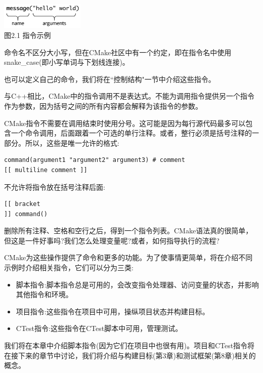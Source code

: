 \begin{center}
\includegraphics[width=0.3\textwidth]{content/1/chapter2/images/1.jpg}\\
图2.1 指令示例
\end{center}

命令名不区分大小写，但在CMake社区中有一个约定，即在指令名中使用snake\_case(即小写单词与下划线连接)。

也可以定义自己的命令，我们将在“控制结构"一节中介绍这些指令。

与C++相比，CMake中的指令调用不是表达式。不能为调用指令提供另一个指令作为参数，因为括号之间的所有内容都会解释为该指令的参数。

CMake指令不需要在调用结束时使用分号。这可能是因为每行源代码最多可以包含一个命令调用，后面跟着一个可选的单行注释。或者，整行必须是括号注释的一部分。所以，这些是唯一允许的格式:

\begin{lstlisting}[style=styleCMake]	
command(argument1 "argument2" argument3) # comment
[[ multiline comment ]]
\end{lstlisting}

不允许将指令放在括号注释后面:

\begin{lstlisting}[style=styleCMake]	
[[ bracket
]] command()
\end{lstlisting}

删除所有注释、空格和空行之后，得到一个指令列表。CMake语法真的很简单，但这是一件好事吗?我们怎么处理变量呢?或者，如何指导执行的流程?

CMake为这些操作提供了命令和更多的功能。为了使事情更简单，将在介绍不同示例时介绍相关指令，它们可以分为三类:

\begin{itemize}
\item 
脚本指令:脚本指令总是可用的，会改变指令处理器、访问变量的状态，并影响其他指令和环境。

\item 
项目指令:这些指令在项目中可用，操纵项目状态并构建目标。

\item 
CTest指令:这些指令在CTest脚本中可用，管理测试。
\end{itemize}

我们将在本章中介绍脚本指令(因为它们在项目中也很有用)。项目和CTest指令将在接下来的章节中讨论，我们将介绍与构建目标(第3章)和测试框架(第8章)相关的概念。

